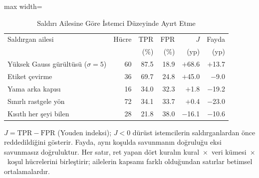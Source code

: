 \begin{table}[!t]
\centering\footnotesize
\setlength{\tabcolsep}{4pt}
\caption{Saldırı Ailesine Göre İstemci Düzeyinde Ayırt Etme}\label{tab:discrimination}
\begin{adjustbox}{max width=\columnwidth}
\begin{tabular}{lrrrrr}
\toprule
Saldırgan ailesi & Hücre & TPR & FPR & $J$ & Fayda \\
 &  & (\%) & (\%) & (yp) & (yp) \\
\midrule
Yüksek Gauss gürültüsü ($\sigma=5$) & 60 & 87.5 & 18.9 & $+$68.6 & $+$13.7 \\
Etiket çevirme & 36 & 69.7 & 24.8 & $+$45.0 & $-$9.0 \\
Yama arka kapısı & 16 & 34.0 & 32.3 & $+$1.8 & $-$19.2 \\
Sınırlı rastgele yön & 72 & 34.1 & 33.7 & $+$0.4 & $-$23.0 \\
Kısıtlı her şeyi bilen & 28 & 21.8 & 38.0 & $-$16.1 & $-$10.6 \\
\bottomrule
\end{tabular}
\end{adjustbox}

\par\vspace{3pt}\parbox{\linewidth}{\footnotesize $J=\mathrm{TPR}-\mathrm{FPR}$ (Youden indeksi); $J<0$ dürüst istemcilerin saldırganlardan önce reddedildiğini gösterir. Fayda, aynı koşulda savunmanın doğruluğu eksi savunmasız doğruluktur. Her satır, ret yapan dört kuralın kural~$\times$~veri kümesi~$\times$~koşul hücrelerini birleştirir; ailelerin kapsamı farklı olduğundan satırlar betimsel ortalamalardır.}
\end{table}
